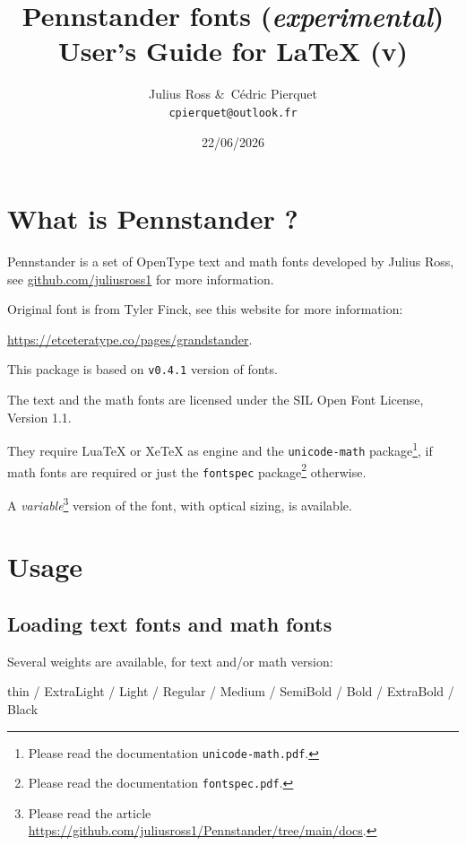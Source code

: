 \documentclass[a4paper]{scrartcl}
\date{22/06/2026}
\title{Pennstander fonts (\textit{experimental}) \\User’s Guide for LaTeX (v\version)}
\author{Julius Ross \&\ Cédric Pierquet \\ \texttt{cpierquet@outlook.fr}}
\newcommand*{\pkg}[1]{\texttt{#1}}
\newcommand*{\file}[1]{\texttt{#1}}
\newcommand*{\version}{0.4.1}
\begin{document}
\maketitle

\bigskip

\section{What is Pennstander ?}

Pennstander is a set of OpenType text and math fonts developed by Julius Ross, see \url{github.com/juliusross1} for more information.


Original font is from Tyler Finck, see this website for more information:

\url{https://etceteratype.co/pages/grandstander}.

\smallskip

This package is based on \texttt{v\version} version of fonts.

The text and the math fonts are licensed under the SIL Open Font License, Version 1.1.

They require LuaTeX or XeTeX as engine and the \pkg{unicode-math} package\footnote{Please read the documentation \file{unicode-math.pdf}.}, if math fonts are required or just the \pkg{fontspec} package\footnote{Please read the documentation \file{fontspec.pdf}.} otherwise.

\smallskip

A \textit{variable}\footnote{Please read the article \url{https://github.com/juliusross1/Pennstander/tree/main/docs}.} version of the font, with optical sizing, is available.

\pagebreak

\section{Usage}

\subsection{Loading text fonts and math fonts}

Several weights are available, for text and/or math version:

{\small \hfill{\pennstanderthin thin} / {\pennstanderextralight ExtraLight} / {\pennstanderlight Light} / {\pennstander Regular} / {\pennstandermedium Medium} / {\pennstandersemibold SemiBold} / {\pennstanderbold Bold} / {\pennstanderextrabold ExtraBold} / {\pennstanderblack Black}\hfill\null}
\end{document}

